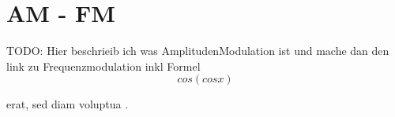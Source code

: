 %
%
%
\section{AM - FM\label{fm:section:teil0}}

TODO:
Hier beschrieib ich was AmplitudenModulation ist und mache dan den link zu Frequenzmodulation inkl Formel \[cos( cos x)\]



erat, sed diam voluptua \cite{fm:bibtex}.


